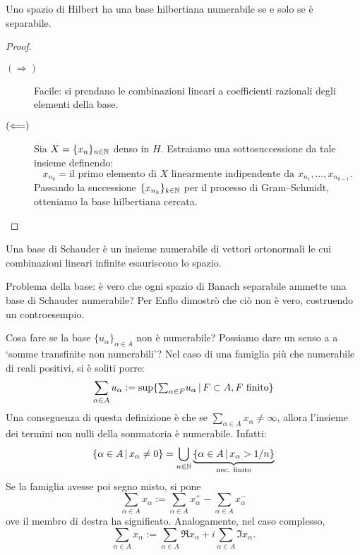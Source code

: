 \begin{theorem}
	Uno spazio di Hilbert ha una base hilbertiana numerabile se e solo se è separabile.
\end{theorem}
\begin{proof}
	\leavevmode
	\begin{description}
		\item[$(\Longrightarrow)$] Facile: si prendano le combinazioni lineari a coefficienti razionali degli elementi della base.
		\item[$(\Longleftarrow)$] Sia $X=\{x_n\}_{n \in \mathbb{N}}$ denso in $H$. Estraiamo una sottosuccessione da tale insieme definendo:
		\begin{equation*}
			x_{n_k} = \text{il primo elemento di $X$ linearmente indipendente da $x_{n_1}, \ldots, x_{n_{k-1}}$}.
		\end{equation*}
		Passando la successione $\{x_{n_k}\}_{k \in \mathbb{N}}$ per il processo di Gram--Schmidt, otteniamo la base hilbertiana cercata.
	\end{description}
\end{proof}

\begin{definition}
	Una base di Schauder è un insieme numerabile di vettori ortonormali le cui combinazioni lineari infinite esauriscono lo spazio.
\end{definition}

Problema della base: è vero che ogni spazio di Banach separabile ammette una base di Schauder numerabile?
Per Enflo \cite{enflo1973counterexample} dimostrò che ciò non è vero, costruendo un controesempio.

Cosa fare se la base $\{u_\alpha\}_{\alpha \in A}$ non è numerabile? Possiamo dare un senso a a `somme transfinite non numerabili'? Nel caso di una famiglia più che numerabile di reali positivi, si è soliti porre:%
\begin{equation*}
	\sum_{\alpha \in A} u_\alpha := \sup \{ {\textstyle \sum_{\alpha \in F}} u_\alpha \,|\, F \subset A, \text{$F$ finito} \}
\end{equation*}
Una conseguenza di questa definizione è che se $\sum_{\alpha \in A} x_\alpha \neq \infty$, allora l'insieme dei termini non nulli della sommatoria è numerabile. Infatti:
\begin{equation*}
	\{\alpha \in A \,|\, x_\alpha \neq 0 \} = \bigcup_{n \in \mathbb{N}} \underbrace{\{ \alpha \in A \,|\, x_\alpha > 1/n \}}_{\text{nec. finito}}
\end{equation*}
Se la famiglia avesse poi segno misto, si pone
\begin{equation*}
	\sum_{\alpha \in A} x_\alpha := \sum_{\alpha \in A} x_\alpha^+ - \sum_{\alpha \in A} x_\alpha^-
\end{equation*}
ove il membro di destra ha significato. Analogamente, nel caso complesso,
\begin{equation*}
	\sum_{\alpha \in A} x_\alpha := \sum_{\alpha \in A} \Re{x_\alpha} + i \sum_{\alpha \in A} \Im{x_\alpha}.
\end{equation*}


